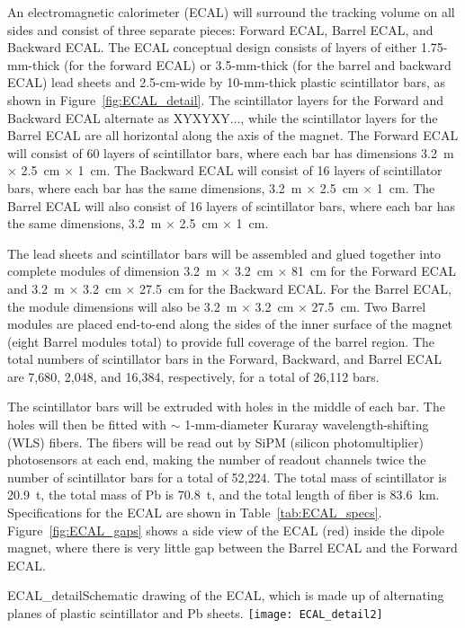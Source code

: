 An electromagnetic calorimeter 
(ECAL) will surround the tracking volume on all sides and consist of three separate pieces: Forward ECAL, Barrel ECAL, and Backward ECAL.  
The ECAL conceptual design 
consists of 
layers of either 1.75-mm-thick (for the forward ECAL) or 3.5-mm-thick 
(for the barrel and backward ECAL) lead sheets and 2.5-cm-wide by 10-mm-thick 
plastic scintillator bars,
as shown in Figure~\ref{fig:ECAL_detail}. The scintillator layers for the
Forward and Backward ECAL alternate as XYXYXY..., while the scintillator 
layers for the Barrel ECAL are all horizontal along the axis of the magnet.
The Forward ECAL will consist of 60 layers of scintillator bars, where each
bar has dimensions 3.2~m $\times$ 2.5~cm $\times$ 1~cm. The
Backward ECAL will consist of 16 layers of scintillator bars, where each 
bar has the same dimensions, 3.2~m $\times$ 2.5~cm $\times$ 1~cm. The Barrel ECAL will also consist 
of 16 layers of scintillator bars, where each bar has the same dimensions, 
3.2~m $\times$ 2.5~cm $\times$ 1~cm. 

The lead sheets and scintillator bars will be assembled and glued together
into complete modules of dimension 
3.2~m $\times$ 3.2~cm $\times$ 81~cm for the Forward ECAL and
3.2~m $\times$ 3.2~cm $\times$ 27.5~cm for the Backward ECAL. For the Barrel ECAL, the module 
dimensions will also be 
3.2~m $\times$ 3.2~cm $\times$ 27.5~cm. Two Barrel modules are placed end-to-end 
along the sides of the inner surface of the magnet (eight Barrel modules
total) to provide full coverage of the barrel region.
The total numbers of scintillator bars in the
Forward, Backward, and Barrel ECAL are 7,680, 2,048, and 16,384, respectively, 
for a total of 26,112 bars. 

The scintillator bars will be extruded with 
holes in the middle of each bar. The
holes will then be fitted with $\sim$ 1-mm-diameter Kuraray wavelength-shifting (WLS) fibers.
The fibers will be read out by SiPM (silicon photomultiplier) photosensors at each end, making the number of 
readout channels twice the number of scintillator bars 
for a total of 52,224. The total mass of scintillator is 20.9~t, 
the total mass of Pb is 70.8~t, and
the total length of fiber is 83.6~km.
Specifications for the ECAL are shown in Table~\ref{tab:ECAL_specs}.  
Figure~\ref{fig:ECAL_gaps} shows a side view of the ECAL (red) inside the dipole
magnet, where there is very little gap between the Barrel ECAL and the Forward ECAL.


\begin{cdrfigure}{ECAL_detail}{Schematic drawing of the ECAL, which is made up of alternating planes
of plastic scintillator and Pb sheets.}
\texttt{[image: ECAL\_detail2]}
\end{cdrfigure}



